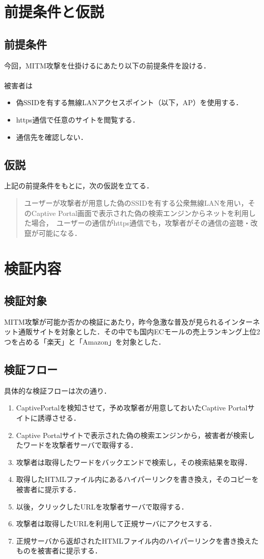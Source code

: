 \documentclass[dvipdfmx]{jsarticle}
\begin{document}
    \section{前提条件と仮説}
    \subsection{前提条件}
    今回，MITM攻撃を仕掛けるにあたり以下の前提条件を設ける．\\
    \\
    被害者は
    \begin{itemize}
        \item 偽SSIDを有する無線LANアクセスポイント（以下，AP）を使用する．
        \item https通信で任意のサイトを閲覧する．
        \item 通信先を確認しない．
    \end{itemize}
    \subsection{仮説}
    上記の前提条件をもとに，次の仮説を立てる．
    \begin{quote}
        ユーザーが攻撃者が用意した偽のSSIDを有する公衆無線LANを用い，そのCaptive Portal画面で表示された偽の検索エンジンからネットを利用した場合，\
        ユーザーの通信がhttps通信でも，攻撃者がその通信の盗聴・改竄が可能になる．
    \end{quote}
    \section{検証内容}
    \subsection{検証対象}
    MITM攻撃が可能か否かの検証にあたり，昨今急激な普及が見られるインターネット通販サイトを対象とした．その中でも国内ECモールの売上ランキング上位2つを占める「楽天」と「Amazon」を対象とした．
    \subsection{検証フロー}
    具体的な検証フローは次の通り．
    \begin{enumerate}
        \item CaptivePortalを検知させて，予め攻撃者が用意しておいたCaptive Portalサイトに誘導させる．
        \item Captive Portalサイトで表示された偽の検索エンジンから，被害者が検索したワードを攻撃者サーバで取得する．
        \item 攻撃者は取得したワードをバックエンドで検索し，その検索結果を取得．
        \item 取得したHTMLファイル内にあるハイパーリンクを書き換え，そのコピーを被害者に提示する．
        \item 以後，クリックしたURLを攻撃者サーバで取得する．
        \item 攻撃者は取得したURLを利用して正規サーバにアクセスする．
        \item 正規サーバから返却されたHTMLファイル内のハイパーリンクを書き換えたものを被害者に提示する．
    \end{enumerate}
\end{document}
